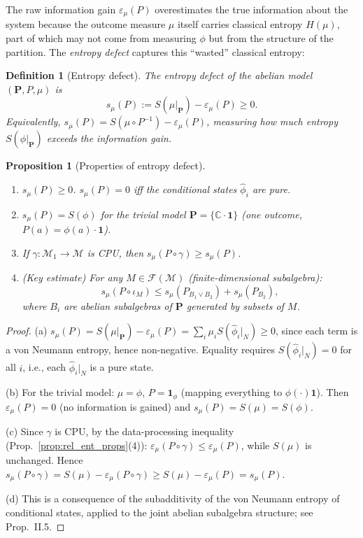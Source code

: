 \documentclass[12pt,a4paper]{article}
\newtheorem{proposition}[theorem]{Proposition}
\newtheorem{definition}[theorem]{Definition}
\newcommand{\CC}{\mathbb{C}}
\newcommand{\id}{\mathbf{1}}  %
\newcommand{\vN}{\mathcal{M}}      %
\newcommand{\eps}{\varepsilon}
\begin{document}
The raw information gain $\eps_\mu(P)$ overestimates the true information about the
system because the outcome measure $\mu$ itself carries classical entropy $H(\mu)$,
part of which may not come from measuring $\phi$ but from the structure of the partition.
The \emph{entropy defect} captures this ``wasted'' classical entropy:

\begin{definition}[Entropy defect]\label{def:entropy_defect}
The \emph{entropy defect} of the abelian model $(\mathbf{P},P,\mu)$ is
\begin{equation}\label{eq:entropy_defect}
  s_\mu(P) := S(\mu|_{\mathbf{P}}) - \eps_\mu(P) \ge 0.
\end{equation}
Equivalently, $s_\mu(P) = S(\mu\circ P^{-1})- \eps_\mu(P)$, measuring how much
entropy $S(\phi|_{\mathbf{P}})$ exceeds the information gain.
\end{definition}

\begin{proposition}[Properties of entropy defect]\label{prop:entropy_defect}
\begin{enumerate}
\item[(a)] $s_\mu(P)\ge 0$.  $s_\mu(P)=0$ iff the conditional states $\hat\phi_i$ are pure.
\item[(b)] $s_\mu(P)=S(\phi)$ for the trivial model $\mathbf{P}=\{\CC\cdot\id\}$
  (one outcome, $P(a)=\phi(a)\cdot\id$).
\item[(c)] If $\gamma:\vN_1\to\vN$ is CPU, then $s_\mu(P\circ\gamma)\ge s_\mu(P)$.
\item[(d)] (Key estimate) For any $M\in\mathcal{F}(\vN)$ (finite-dimensional subalgebra):
  \begin{equation}\label{eq:defect_bound}
    s_\mu(P\circ\iota_M) \le s_\mu(P_{B_1\vee B_2}) + s_\mu(P_{B_2}),
  \end{equation}
  where $B_i$ are abelian subalgebras of $\mathbf{P}$ generated by subsets of $M$.
\end{enumerate}
\end{proposition}

\begin{proof}
(a) $s_\mu(P)=S(\mu|_\mathbf{P})-\eps_\mu(P)=\sum_i\mu_i S(\hat\phi_i|_N)\ge 0$,
since each term is a von Neumann entropy, hence non-negative.  Equality requires
$S(\hat\phi_i|_N)=0$ for all $i$, i.e., each $\hat\phi_i|_N$ is a pure state.

(b) For the trivial model: $\mu=\phi$, $P=\id_\phi$ (mapping everything to $\phi(\cdot)\id$).
Then $\eps_\mu(P)=0$ (no information is gained) and $s_\mu(P)=S(\mu)=S(\phi)$.

(c) Since $\gamma$ is CPU, by the data-processing inequality (Prop.~\ref{prop:rel_ent_props}(4)):
$\eps_\mu(P\circ\gamma)\le\eps_\mu(P)$, while
$S(\mu)$ is unchanged.  Hence $s_\mu(P\circ\gamma)=S(\mu)-\eps_\mu(P\circ\gamma)\ge
S(\mu)-\eps_\mu(P)=s_\mu(P)$.

(d) This is a consequence of the subadditivity of the von Neumann entropy of conditional
states, applied to the joint abelian subalgebra structure; see \cite{cnt87} Prop.~II.5.
\end{proof}
\end{document}
